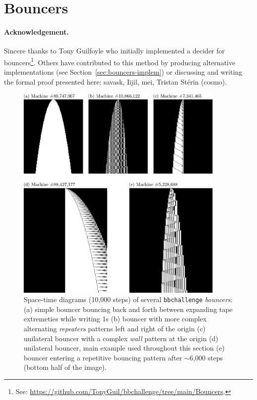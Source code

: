 
\section{Bouncers}\label{sec:bouncers}

\paragraph{Acknowledgement.}  Sincere thanks to Tony Guilfoyle who initially implemented a decider for bouncers\footnote{See: \url{https://github.com/TonyGuil/bbchallenge/tree/main/Bouncers}.}.
Others have contributed to this method by producing alternative implementations (see Section~\ref{sec:bouncers-implem}) or discussing and writing the formal proof presented here: savask, Iijil, mei, Tristan Stérin (cosmo).


\begin{figure}[h!]
    \centering
    \includegraphics*[width=0.9\textwidth]{figures/bouncers/bouncers.pdf}
    \caption{Space-time diagrams (10,000 steps) of several \texttt{bbchallenge} \textit{bouncers}: (a) simple bouncer bouncing back and forth between expanding tape extremeties while writing 1s (b) bouncer with more complex alternating \textit{repeaters} patterns left and right of the origin (c) unilateral bouncer with a complex \textit{wall} pattern at the origin (d) unilateral bouncer, main example used throughout this section (e) bouncer entering a repetitive bouncing pattern after $\sim$6,000 steps (bottom half of the image).}\label{fig:bouncers}
\end{figure}

